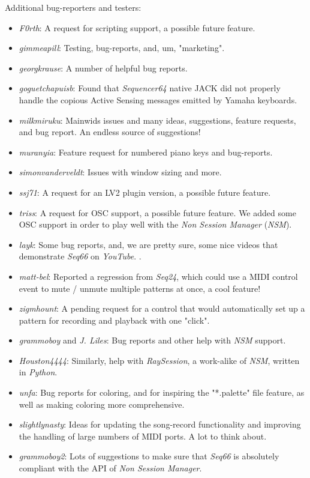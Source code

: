    Additional bug-reporters and testers:

   \begin{itemize}
      \item \textsl{F0rth}:
         A request for scripting support, a possible future feature.
      \item \textsl{gimmeapill}:
         Testing, bug-reports, and, um, "marketing".
      \item \textsl{georgkrause}:
         A number of helpful bug reports.
      \item \textsl{goguetchapuisb}:
         Found that \textsl{Sequencer64} native JACK did not properly handle
         the copious Active Sensing messages emitted by Yamaha keyboards.
      \item \textsl{milkmiruku}:
         Mainwids issues and many ideas, suggestions, feature requests, and bug
         report.  An endless source of suggestions!
      \item \textsl{muranyia}:
         Feature request for numbered piano keys and bug-reports.
      \item \textsl{simonvanderveldt}:
         Issues with window sizing and more.
      \item \textsl{ssj71}:
         A request for an LV2 plugin version, a possible future feature.
      \item \textsl{triss}:
         A request for OSC support, a possible future feature.  We added some
         OSC support in order to play well with the \textsl{Non Session
         Manager} (\textsl{NSM}).
      \item \textsl{layk}:
         Some bug reports, and, we are pretty sure, some nice videos that
         demonstrate \textsl{Seq66} on \textsl{YouTube}.
         \cite{layk}.
      \item \textsl{matt-bel}:
         Reported a regression from \textsl{Seq24}, which could use
         a MIDI control event to mute / unmute multiple patterns at once,
         a cool feature!
      \item \textsl{zigmhount}:
         A pending request for a control that would automatically set up a
         pattern for recording and playback with one "click".
      \item \textsl{grammoboy} and \textsl{J. Liles}:
         Bug reports and other help with \textsl{NSM} support.
      \item \textsl{Houston4444}:
         Similarly, help with \textsl{RaySession}, a work-alike of
         \textsl{NSM}, written in \textsl{Python}.
      \item \textsl{unfa}:
         Bug reports for coloring, and for inspiring the "*.palette" file
         feature, as well as making coloring more comprehensive.
      \item \textsl{slightlynasty}:
         Ideas for updating the song-record functionality and improving the
         handling of large numbers of MIDI ports.
         A lot to think about.
      \item \textsl{grammoboy2}:
         Lots of suggestions to make sure that \textsl{Seq66} is absolutely
         compliant with the API of \textsl{Non Session Manager}.
   \end{itemize}

